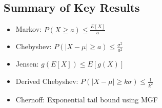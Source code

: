 \documentclass{article}
\begin{document}
\subsection*{Summary of Key Results}
\begin{itemize}
    \item Markov: $\displaystyle P(X \ge a) \le \frac{E[X]}{a}$
    \item Chebyshev: $\displaystyle P(|X-\mu|\ge a)\le \frac{\sigma^2}{a^2}$
    \item Jensen: $\displaystyle g(E[X]) \le E[g(X)]$
    \item Derived Chebyshev: $\displaystyle P(|X-\mu|\ge k\sigma)\le \frac{1}{k^2}$
    \item Chernoff: Exponential tail bound using MGF
\end{itemize}
\end{document}
